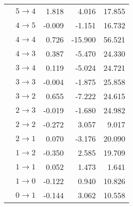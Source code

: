 \begin{longtable}{cc|rrr}
 & $5 \rightarrow 4$ &1.818&4.016&17.855\\
 & $4 \rightarrow 5$ &-0.009&-1.151&16.732\\
 & $4 \rightarrow 4$ &0.726&-15.900&56.521\\
 & $4 \rightarrow 3$ &0.387&-5.470&24.330\\
 & $3 \rightarrow 4$ &0.119&-5.024&24.721\\
 & $3 \rightarrow 3$ &-0.004&-1.875&25.858\\
 & $3 \rightarrow 2$ &0.655&-7.222&24.615\\
 & $2 \rightarrow 3$ &-0.019&-1.680&24.982\\
 & $2 \rightarrow 2$ &-0.272&3.057&9.017\\
 & $2 \rightarrow 1$ &0.070&-3.176&20.090\\
 & $1 \rightarrow 2$ &-0.350&2.585&19.709\\
 & $1 \rightarrow 1$ &0.052&1.473&1.641\\
 & $1 \rightarrow 0$ &-0.122&0.940&10.826\\
 & $0 \rightarrow 1$ &-0.144&3.062&10.558
\end{longtable}%
%